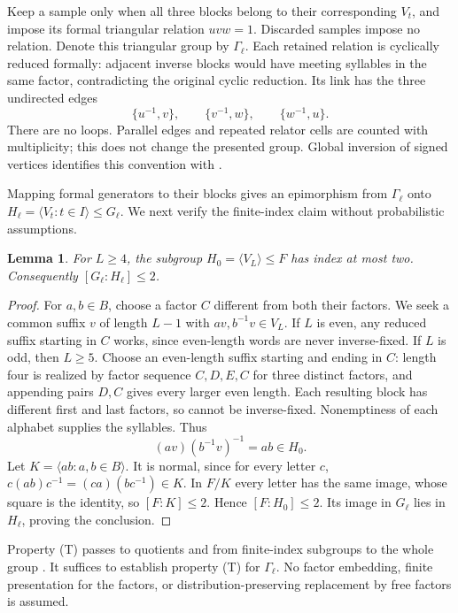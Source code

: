 \documentclass[11pt,letterpaper]{article}
\newtheorem{lemma}{Lemma}
\begin{document}
Keep a sample only when all three blocks belong to their corresponding $V_t$, and impose its formal triangular relation $uvw=1$. Discarded samples impose no relation. Denote this triangular group by $\Gamma_\ell$. Each retained relation is cyclically reduced formally: adjacent inverse blocks would have meeting syllables in the same factor, contradicting the original cyclic reduction. Its link has the three undirected edges
\begin{equation}\label{eq:edges}
 \{u^{-1},v\},\qquad\{v^{-1},w\},\qquad\{w^{-1},u\}.
\end{equation}
There are no loops. Parallel edges and repeated relator cells are counted with multiplicity; this does not change the presented group. Global inversion of signed vertices identifies this convention with \cite[Definition 2.12]{kk}.

Mapping formal generators to their blocks gives an epimorphism from $\Gamma_\ell$ onto $H_\ell=\langle V_t:t\in I\rangle\leq G_\ell$. We next verify the finite-index claim without probabilistic assumptions.

\begin{lemma}\label{lem:index}
For $L\geq4$, the subgroup $H_0=\langle V_L\rangle\leq F$ has index at most two. Consequently $[G_\ell:H_\ell]\leq2$.
\end{lemma}
\begin{proof}
For $a,b\in B$, choose a factor $C$ different from both their factors. We seek a common suffix $v$ of length $L-1$ with $av,b^{-1}v\in V_L$. If $L$ is even, any reduced suffix starting in $C$ works, since even-length words are never inverse-fixed. If $L$ is odd, then $L\geq5$. Choose an even-length suffix starting and ending in $C$: length four is realized by factor sequence $C,D,E,C$ for three distinct factors, and appending pairs $D,C$ gives every larger even length. Each resulting block has different first and last factors, so cannot be inverse-fixed. Nonemptiness of each alphabet supplies the syllables. Thus
\[
 (av)(b^{-1}v)^{-1}=ab\in H_0.
\]
Let $K=\langle ab:a,b\in B\rangle$. It is normal, since for every letter $c$,
$c(ab)c^{-1}=(ca)(bc^{-1})\in K$. In $F/K$ every letter has the same image, whose square is the identity, so $[F:K]\leq2$. Hence $[F:H_0]\leq2$. Its image in $G_\ell$ lies in $H_\ell$, proving the conclusion.
\end{proof}

Property (T) passes to quotients and from finite-index subgroups to the whole group \cite[Remarks 2.10--2.11]{kk}. It suffices to establish property (T) for $\Gamma_\ell$. No factor embedding, finite presentation for the factors, or distribution-preserving replacement by free factors is assumed.
\end{document}
